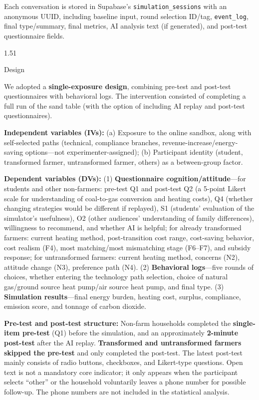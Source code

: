 \documentclass[stu,12pt,floatsintext,donotrepeattitle]{apa7}
\makeatletter
\newcommand{\Sihao}{\fontsize{14pt}{18pt}\selectfont}
\renewcommand{\subsection}{\@startsection{subsection}{2}{\z@}%
  {1.5\baselineskip}{1\baselineskip}%
  {\normalfont\Sihao\bfseries\raggedright}}
\makeatother
\begin{document}
Each conversation is stored in Supabase's \texttt{simulation\_sessions} with an anonymous UUID, including baseline input, round selection ID/tag, \texttt{event\_log}, final type/summary, final metrics, AI analysis text (if generated), and post-test questionnaire fields.

\subsection{Design}

We adopted a \textbf{single-exposure design}, combining pre-test and post-test questionnaires with behavioral logs. The intervention consisted of completing a full run of the sand table (with the option of including AI replay and post-test questionnaires).

\textbf{Independent variables (IVs):} (a) Exposure to the online sandbox, along with self-selected paths (technical, compliance branches, revenue-increase/energy-saving options---not experimenter-assigned); (b) Participant identity (student, transformed farmer, untransformed farmer, others) as a between-group factor.

\textbf{Dependent variables (DVs):} (1) \textbf{Questionnaire cognition/attitude}---for students and other non-farmers: pre-test Q1 and post-test Q2 (a 5-point Likert scale for understanding of coal-to-gas conversion and heating costs), Q4 (whether changing strategies would be different if replayed), S1 (students' evaluation of the simulator's usefulness), O2 (other audiences' understanding of family differences), willingness to recommend, and whether AI is helpful; for already transformed farmers: current heating method, post-transition cost range, cost-saving behavior, cost realism (F4), most matching/most mismatching stage (F6--F7), and subsidy response; for untransformed farmers: current heating method, concerns (N2), attitude change (N3), preference path (N4). (2) \textbf{Behavioral logs}---five rounds of choices, whether entering the technology path selection, choice of natural gas/ground source heat pump/air source heat pump, and final type. (3) \textbf{Simulation results}---final energy burden, heating cost, surplus, compliance, emission score, and tonnage of carbon dioxide.

\textbf{Pre-test and post-test structure:} Non-farm households completed the \textbf{single-item pre-test} (Q1) before the simulation, and an approximately \textbf{2-minute post-test} after the AI replay. \textbf{Transformed and untransformed farmers skipped the pre-test} and only completed the post-test. The latest post-test mainly consists of radio buttons, checkboxes, and Likert-type questions. Open text is not a mandatory core indicator; it only appears when the participant selects ``other'' or the household voluntarily leaves a phone number for possible follow-up. The phone numbers are not included in the statistical analysis.
\end{document}
